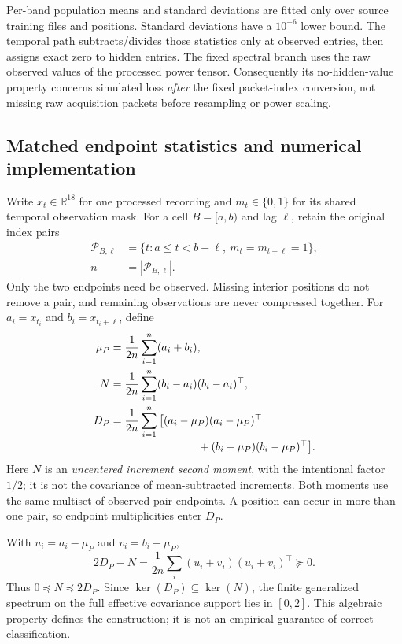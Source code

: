 Per-band population means and standard deviations are fitted only over source
training files and positions. Standard deviations have a $10^{-6}$ lower
bound. The temporal path subtracts/divides those statistics only at observed
entries, then assigns exact zero to hidden entries. The fixed spectral branch
uses the raw observed values of the processed power tensor. Consequently its
no-hidden-value property concerns simulated loss \emph{after} the fixed
packet-index conversion, not missing raw acquisition packets before
resampling or power scaling.

\subsection*{Matched endpoint statistics and numerical implementation}
Write $x_t\in\mathbb R^{18}$ for one processed recording and
$m_t\in\{0,1\}$ for its shared temporal observation mask. For a cell
$B=[a,b)$ and lag $\ell$, retain the original index pairs
\begin{equation}
 \begin{aligned}
 \mathcal P_{B,\ell}&=
 \{t:a\leq t<b-\ell,\ m_t=m_{t+\ell}=1\},\\
 n&=|\mathcal P_{B,\ell}|.
 \end{aligned}
 \label{eq:m2-pairs}
\end{equation}
Only the two endpoints need be observed. Missing interior positions do not
remove a pair, and remaining observations are never compressed together.
For $a_i=x_{t_i}$ and $b_i=x_{t_i+\ell}$, define
\begin{align}
 \mu_P&=\frac{1}{2n}\sum_{i=1}^{n}(a_i+b_i),\label{eq:m2-mean}\\
 N&=\frac{1}{2n}\sum_{i=1}^{n}(b_i-a_i)(b_i-a_i)^\top,\label{eq:m2-N}\\
 D_P&=\frac{1}{2n}\sum_{i=1}^{n}
 \big[(a_i-\mu_P)(a_i-\mu_P)^\top\nonumber\\[-2pt]
 &\hspace{28mm}+(b_i-\mu_P)(b_i-\mu_P)^\top\big].\label{eq:m2-D}
\end{align}
Here $N$ is an \emph{uncentered increment second moment}, with the intentional
factor $1/2$; it is not the covariance of mean-subtracted increments. Both
moments use the same multiset of observed pair endpoints. A position can
occur in more than one pair, so endpoint multiplicities enter $D_P$.

With $u_i=a_i-\mu_P$ and $v_i=b_i-\mu_P$,
\begin{equation}
 2D_P-N=\frac{1}{2n}\sum_i(u_i+v_i)(u_i+v_i)^\top\succeq0.
 \label{eq:m2-bound}
\end{equation}
Thus $0\preceq N\preceq2D_P$. Since
$\ker(D_P)\subseteq\ker(N)$, the finite generalized spectrum on the full
effective covariance support lies in $[0,2]$. This algebraic property defines
the construction; it is not an empirical guarantee of correct classification.

